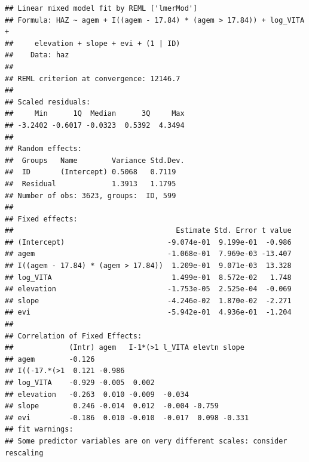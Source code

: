\documentclass[11pt,]{article}
\newenvironment{Shaded}{\begin{snugshade}}{\end{snugshade}}
\newcommand{\CommentTok}[1]{\textcolor[rgb]{0.56,0.35,0.01}{\textit{#1}}}
\newcommand{\DataTypeTok}[1]{\textcolor[rgb]{0.13,0.29,0.53}{#1}}
\newcommand{\DecValTok}[1]{\textcolor[rgb]{0.00,0.00,0.81}{#1}}
\newcommand{\KeywordTok}[1]{\textcolor[rgb]{0.13,0.29,0.53}{\textbf{#1}}}
\newcommand{\NormalTok}[1]{#1}
\newcommand{\OperatorTok}[1]{\textcolor[rgb]{0.81,0.36,0.00}{\textbf{#1}}}
\newcommand{\StringTok}[1]{\textcolor[rgb]{0.31,0.60,0.02}{#1}}
\begin{document}
\begin{verbatim}
## Linear mixed model fit by REML ['lmerMod']
## Formula: HAZ ~ agem + I((agem - 17.84) * (agem > 17.84)) + log_VITA +  
##     elevation + slope + evi + (1 | ID)
##    Data: haz
## 
## REML criterion at convergence: 12146.7
## 
## Scaled residuals: 
##     Min      1Q  Median      3Q     Max 
## -3.2402 -0.6017 -0.0323  0.5392  4.3494 
## 
## Random effects:
##  Groups   Name        Variance Std.Dev.
##  ID       (Intercept) 0.5068   0.7119  
##  Residual             1.3913   1.1795  
## Number of obs: 3623, groups:  ID, 599
## 
## Fixed effects:
##                                      Estimate Std. Error t value
## (Intercept)                        -9.074e-01  9.199e-01  -0.986
## agem                               -1.068e-01  7.969e-03 -13.407
## I((agem - 17.84) * (agem > 17.84))  1.209e-01  9.071e-03  13.328
## log_VITA                            1.499e-01  8.572e-02   1.748
## elevation                          -1.753e-05  2.525e-04  -0.069
## slope                              -4.246e-02  1.870e-02  -2.271
## evi                                -5.942e-01  4.936e-01  -1.204
## 
## Correlation of Fixed Effects:
##             (Intr) agem   I-1*(>1 l_VITA elevtn slope 
## agem        -0.126                                    
## I((-17.*(>1  0.121 -0.986                             
## log_VITA    -0.929 -0.005  0.002                      
## elevation   -0.263  0.010 -0.009  -0.034              
## slope        0.246 -0.014  0.012  -0.004 -0.759       
## evi         -0.186  0.010 -0.010  -0.017  0.098 -0.331
## fit warnings:
## Some predictor variables are on very different scales: consider rescaling
\end{verbatim}

\begin{Shaded}
\end{Shaded}
\end{document}
